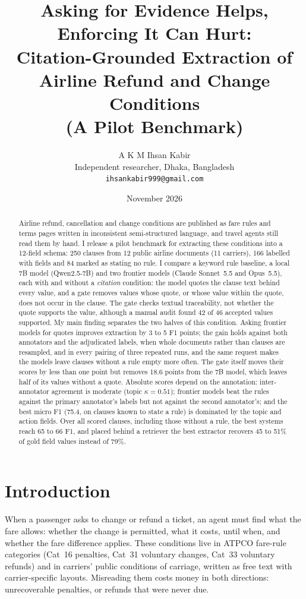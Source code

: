 \documentclass[11pt,a4paper]{article}
\title{Asking for Evidence Helps, Enforcing It Can Hurt:\\
Citation-Grounded Extraction of Airline Refund and Change Conditions\\
\large (A Pilot Benchmark)}
\author{A K M Ihsan Kabir\\
\small Independent researcher, Dhaka, Bangladesh\\
\small\texttt{ihsankabir999@gmail.com}}
\date{November 2026}
\begin{document}
\maketitle

\begin{abstract}
Airline refund, cancellation and change conditions are published as fare rules and terms pages written in inconsistent semi-structured language, and travel agents still read them by hand. I release a pilot benchmark for extracting these conditions into a 12-field schema: 250 clauses from 12 public airline documents (11 carriers), 166 labelled with fields and 84 marked as stating no rule. I compare a keyword rule baseline, a local 7B model (Qwen2.5-7B) and two frontier models (Claude Sonnet~5.5 and Opus~5.5), each with and without a \emph{citation} condition: the model quotes the clause text behind every value, and a gate removes values whose quote, or whose value within the quote, does not occur in the clause. The gate checks textual traceability, not whether the quote supports the value, although a manual audit found 42 of 46 accepted values supported. My main finding separates the two halves of this condition. Asking frontier models for quotes improves extraction by 3 to 5 F1 points; the gain holds against both annotators and the adjudicated labels, when whole documents rather than clauses are resampled, and in every pairing of three repeated runs, and the same request makes the models leave clauses without a rule empty more often. The gate itself moves their scores by less than one point but removes 18.6 points from the 7B model, which leaves half of its values without a quote. Absolute scores depend on the annotation: inter-annotator agreement is moderate (topic $\kappa = 0.51$); frontier models beat the rules against the primary annotator's labels but not against the second annotator's; and the best micro F1 (75.4, on clauses known to state a rule) is dominated by the topic and action fields. Over all scored clauses, including those without a rule, the best systems reach 65 to 66 F1, and placed behind a retriever the best extractor recovers 45 to 51\% of gold field values instead of 79\%.
\end{abstract}

\section{Introduction}

When a passenger asks to change or refund a ticket, an agent must find what the fare allows: whether the change is permitted, what it costs, until when, and whether the fare difference applies. These conditions live in ATPCO fare-rule categories (Cat~16 penalties, Cat~31 voluntary changes, Cat~33 voluntary refunds) and in carriers' public conditions of carriage, written as free text with carrier-specific layouts. Misreading them costs money in both directions: unrecoverable penalties, or refunds that were never due.
\end{document}

